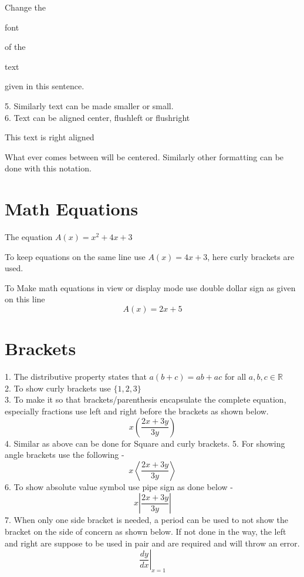 \documentclass{article}
\begin{document}
\vspace{1cm}

\begin{Large}Change the \begin{normalsize}font\end{normalsize} of the \begin{Huge}text\end{Huge} given in this sentence.\end{Large}

\vspace{1cm}

5. Similarly text can be made smaller or small.\\
6. Text can be aligned center, flushleft or flushright

\begin{flushright}This text is right aligned \end{flushright}

\begin{center}
What ever comes between will be centered. Similarly other formatting can be done with this notation.
\end{center}


\section{Math Equations}
The equation $A(x)= x^2+4x+3$

To keep equations on the same line use ${A(x) = 4x + 3}$, here curly brackets are used.

To Make math equations in view or display mode use double dollar sign as given on this line $$A(x) = 2x+5$$

\section{Brackets}

1. The distributive property states that $a(b+c) = ab + ac$ for all $a, b, c \in \mathbb{R}$\\
2. To show curly brackets use $\{1, 2, 3\}$\\
3. To make it so that brackets/parenthesis encapsulate the complete equation, especially fractions use left and right before the brackets as shown below.
$$x\left(  \frac{2x +  3y}{3y}  \right)$$
4. Similar as above can be done for Square and curly brackets.
5. For showing angle brackets use the following - 
$$x\left\langle  \frac{2x +  3y}{3y}  \right \rangle$$
6. To show absolute value symbol use pipe sign as done below -
$$x\left |  \frac{2x +  3y}{3y}  \right |$$
7. When only one side bracket is needed, a period can be used to not show the bracket on the side of concern as shown below. If not done in the way, the left and right are suppose to be used in pair and are required and will throw an error.
$$\left. \frac{dy}{dx}\right|_{x=1}$$
\end{document}
